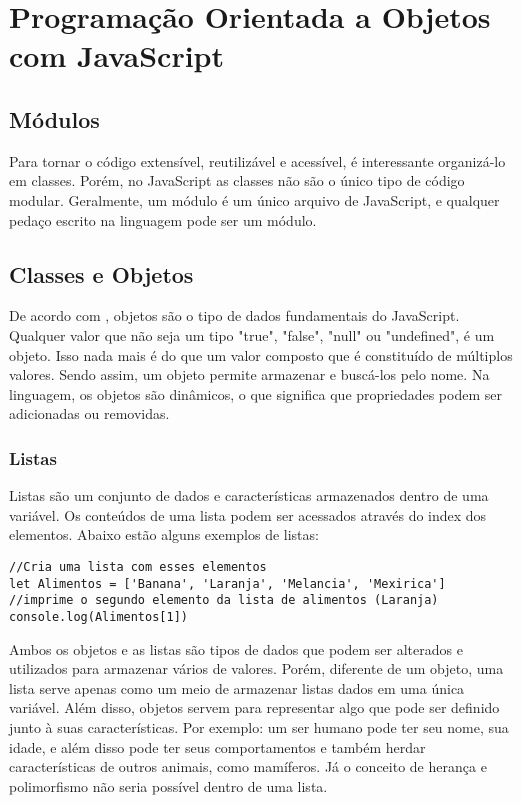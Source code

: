 

\chapter{ Programa\c{c}\~{a}o Orientada a Objetos com JavaScript}


	\section{Módulos}
	Para tornar o código extensível, reutilizável e acessível, é interessante organizá-lo em classes. Porém, no JavaScript as classes não são o único tipo de código modular. Geralmente, um módulo é um único arquivo de JavaScript, e qualquer pedaço escrito na linguagem pode ser um módulo.
    \section{Classes e Objetos}
De acordo com \cite{flanagan2020javascript}, objetos são o tipo de dados fundamentais do JavaScript. Qualquer valor que não seja um tipo "true", "false", "null" ou "undefined", é um objeto. Isso nada mais é do que um valor composto que é constituído de múltiplos valores. Sendo assim, um objeto permite armazenar e buscá-los pelo nome. Na linguagem, os objetos são dinâmicos, o que significa que propriedades podem ser adicionadas ou removidas. 

\subsection{Listas}
Listas são um conjunto de dados e características armazenados dentro de uma variável. Os conteúdos de uma lista podem ser acessados através do index dos elementos. Abaixo estão alguns exemplos de listas: \newline

\begin{lstlisting}
//Cria uma lista com esses elementos
let Alimentos = ['Banana', 'Laranja', 'Melancia', 'Mexirica']  
//imprime o segundo elemento da lista de alimentos (Laranja) 
console.log(Alimentos[1])  
\end{lstlisting}

Ambos os objetos e as listas são tipos de dados que podem ser alterados e utilizados para armazenar vários de valores. Porém, diferente de um objeto, uma lista serve apenas como um meio de armazenar listas dados em uma única variável. Além disso, objetos servem para representar algo que pode ser definido junto à suas características. Por exemplo: um ser humano pode ter seu nome, sua idade, e além disso pode ter seus comportamentos e também herdar características de outros animais, como mamíferos. Já o conceito de herança e polimorfismo não seria possível dentro de uma lista.

